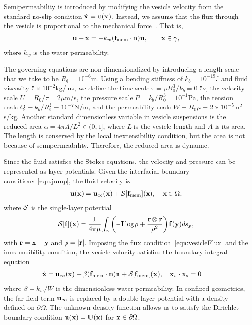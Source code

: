 \documentclass[9pt,twocolumn,twoside,lineno]{pnas-new}
\begin{document}
Semipermeability is introduced by modifying the vesicle velocity from
the standard no-slip condition $\dot{\mathbf{x}} = \mathbf{u}(\mathbf{x})$. Instead, we
assume that the flux through the vesicle is proportional to the
mechanical force~\cite{yao-mor2017}. That is, 
\begin{align}
  \label{eqn:vesicleFlux}
  \mathbf{u} - \dot{\mathbf{x}} = - k_w (\mathbf{f}_\mathrm{mem} \cdot \mathbf{n}) \mathbf{n}, \qquad
  \mathbf{x} \in \gamma,
\end{align}
where $k_w$ is the water permeability.

The governing equations are non-dimensionalized by introducing a length
scale that we take to be $R_0 = 10^{-6}$m. Using a bending stiffness of
$k_b = 10^{-19}$J and fluid viscosity $5 \times 10^{-2}$kg/ms, we define
the time scale $\tau = \mu R_0^3/k_b = 0.5s$, the velocity scale $U =
R_0/\tau = 2\mu$m/s, the pressure scale $P = k_b/R_0^3 = 10^{-1}$Pa, the
tension scale $Q = k_b/R_0^2 = 10^{-7}$N/m, and the permeability scale
$W = R_0\mu = 2 \times 10^{-5}$m$^2$s/kg. Another standard dimensionless
variable in vesicle suspensions is the reduced area $\alpha = 4\pi A/L^2
\in (0,1]$, where $L$ is the vesicle length and $A$ is its area. The
length is conserved by the local inextensibility condition, but the area
is not because of semipermeability. Therefore, the reduced area is
dynamic.

Since the fluid satisfies the Stokes equations, the velocity and
pressure can be represented as layer potentials. Given the interfacial
boundary conditions~\eqref{eqn:jump}, the fluid velocity is
\begin{align}
  \mathbf{u}(\mathbf{x}) = \mathbf{u}_\infty(\mathbf{x}) + \mathcal{S}[\mathbf{f}_\mathrm{mem}](\mathbf{x}), \quad
    \mathbf{x} \in \Omega,
\end{align}
where $\mathcal{S}$ is the single-layer potential
\begin{align}
  \mathcal{S}[\mathbf{f}](\mathbf{x}) = \frac{1}{4\pi\mu} \int_{\gamma} \left(
    -\mathbf{I} \log\rho + \frac{\mathbf{r} \otimes \mathbf{r}}{\rho^2} \right)
    \mathbf{f}(\mathbf{y}) ds_{\mathbf{y}},
\end{align}
with $\mathbf{r} = \mathbf{x} - \mathbf{y}$ and $\rho = |\mathbf{r}|$. Imposing the flux
condition~\eqref{eqn:vesicleFlux} and the inextensibility condition, the
vesicle velocity satisfies the boundary integral equation
\begin{align}
  \label{eqn:vesVelocity}
  \dot{\mathbf{x}} &= \mathbf{u}_\infty(\mathbf{x}) + \beta (\mathbf{f}_\mathrm{mem}\cdot\mathbf{n})\mathbf{n}
  + \mathcal{S} [\mathbf{f}_\mathrm{mem}](\mathbf{x}),  \quad
  \mathbf{x}_s \cdot \dot{\mathbf{x}}_s = 0,
\end{align}
where $\beta = k_w/W$ is the dimensionless water permeability. In
confined geometries, the far field term $\mathbf{u}_\infty$ is replaced by a
double-layer potential with a density defined on $\partial\Omega$. The
unknown density function allows us to satisfy the Dirichlet boundary
condition $\mathbf{u}(\mathbf{x}) = \mathbf{U}(\mathbf{x})$ for $\mathbf{x} \in \partial\Omega$.
\end{document}
